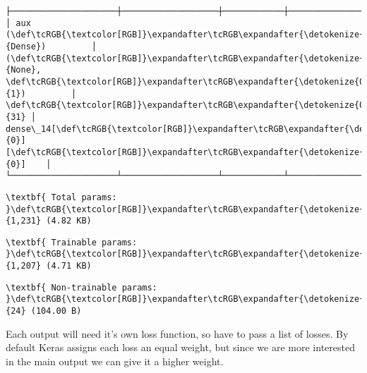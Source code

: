 \documentclass[12pt letter]{report}
\begin{document}
\begin{Verbatim}[commandchars=\\\{\}]
├─────────────────────┼───────────────────┼────────────┼───────────────────┤
│ aux (\def\tcRGB{\textcolor[RGB]}\expandafter\tcRGB\expandafter{\detokenize{0,135,255}}{Dense})         │ (\def\tcRGB{\textcolor[RGB]}\expandafter\tcRGB\expandafter{\detokenize{0,215,255}}{None}, \def\tcRGB{\textcolor[RGB]}\expandafter\tcRGB\expandafter{\detokenize{0,175,0}}{1})         │         \def\tcRGB{\textcolor[RGB]}\expandafter\tcRGB\expandafter{\detokenize{0,175,0}}{31} │ dense\_14[\def\tcRGB{\textcolor[RGB]}\expandafter\tcRGB\expandafter{\detokenize{0,175,0}}{0}][\def\tcRGB{\textcolor[RGB]}\expandafter\tcRGB\expandafter{\detokenize{0,175,0}}{0}]    │
└─────────────────────┴───────────────────┴────────────┴───────────────────┘

    \end{Verbatim}

    
    
    \begin{Verbatim}[commandchars=\\\{\}]
\textbf{ Total params: }\def\tcRGB{\textcolor[RGB]}\expandafter\tcRGB\expandafter{\detokenize{0,175,0}}{1,231} (4.82 KB)

    \end{Verbatim}

    
    
    \begin{Verbatim}[commandchars=\\\{\}]
\textbf{ Trainable params: }\def\tcRGB{\textcolor[RGB]}\expandafter\tcRGB\expandafter{\detokenize{0,175,0}}{1,207} (4.71 KB)

    \end{Verbatim}

    
    
    \begin{Verbatim}[commandchars=\\\{\}]
\textbf{ Non-trainable params: }\def\tcRGB{\textcolor[RGB]}\expandafter\tcRGB\expandafter{\detokenize{0,175,0}}{24} (104.00 B)

    \end{Verbatim}

    
Each output will need it's own loss function, so have to pass a list of
losses. By default Keras assigns each loss an equal weight, but since we
are more interested in the main output we can give it a higher weight.
\end{document}
